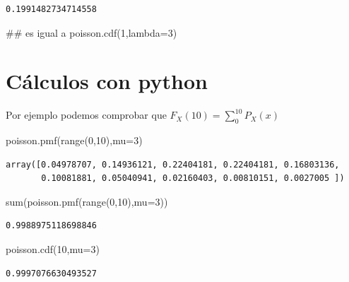 \documentclass[
  letterpaper,
  DIV=11,
  numbers=noendperiod]{scrreprt}
\newenvironment{Shaded}{\begin{snugshade}}{\end{snugshade}}
\newcommand{\BuiltInTok}[1]{\textcolor[rgb]{0.00,0.23,0.31}{#1}}
\newcommand{\CommentTok}[1]{\textcolor[rgb]{0.37,0.37,0.37}{#1}}
\newcommand{\DecValTok}[1]{\textcolor[rgb]{0.68,0.00,0.00}{#1}}
\newcommand{\NormalTok}[1]{\textcolor[rgb]{0.00,0.23,0.31}{#1}}
\newcommand{\OperatorTok}[1]{\textcolor[rgb]{0.37,0.37,0.37}{#1}}
\begin{document}
\begin{verbatim}
0.1991482734714558
\end{verbatim}

\begin{Shaded}
\begin{Highlighting}[]
\CommentTok{\#\# es igual a poisson.cdf(1,lambda=3)}
\end{Highlighting}
\end{Shaded}

\section{Cálculos con python}\label{cuxe1lculos-con-python-6}

Por ejemplo podemos comprobar que
\(F_X(10)=\displaystyle\sum_{0}^{10} P_X(x)\)

\begin{Shaded}
\begin{Highlighting}[]
\NormalTok{poisson.pmf(}\BuiltInTok{range}\NormalTok{(}\DecValTok{0}\NormalTok{,}\DecValTok{10}\NormalTok{),mu}\OperatorTok{=}\DecValTok{3}\NormalTok{)}
\end{Highlighting}
\end{Shaded}

\begin{verbatim}
array([0.04978707, 0.14936121, 0.22404181, 0.22404181, 0.16803136,
       0.10081881, 0.05040941, 0.02160403, 0.00810151, 0.0027005 ])
\end{verbatim}

\begin{Shaded}
\begin{Highlighting}[]
\BuiltInTok{sum}\NormalTok{(poisson.pmf(}\BuiltInTok{range}\NormalTok{(}\DecValTok{0}\NormalTok{,}\DecValTok{10}\NormalTok{),mu}\OperatorTok{=}\DecValTok{3}\NormalTok{))}
\end{Highlighting}
\end{Shaded}

\begin{verbatim}
0.9988975118698846
\end{verbatim}

\begin{Shaded}
\begin{Highlighting}[]
\NormalTok{poisson.cdf(}\DecValTok{10}\NormalTok{,mu}\OperatorTok{=}\DecValTok{3}\NormalTok{)}
\end{Highlighting}
\end{Shaded}

\begin{verbatim}
0.9997076630493527
\end{verbatim}
\end{document}
